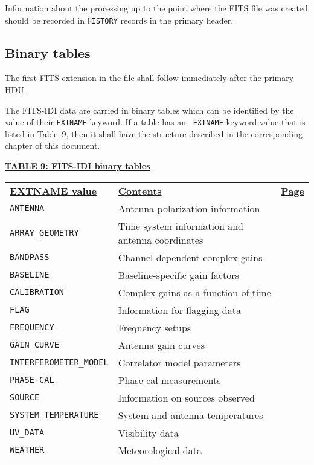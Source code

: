 \documentclass[twoside]{article}
\newcommand{\Hi}[1]{\textcolor{hicol}{#1}}
\begin{document}
Information about the processing up to the point where the FITS file
was created should be recorded in {\tt HISTORY} records in the primary
header.

\subsection{Binary tables}

The first FITS extension in the file shall follow immediately after
the primary \Hi{HDU\@.}

The FITS-IDI data are carried in binary tables which can be identified
by the value of their {\tt EXTNAME} keyword.  If a table has an {\tt
  EXTNAME} keyword \Hi{value} that is listed in Table~9, then it shall
have the structure described in the corresponding chapter of this
document.

\begin{center}
\underline{\bf{TABLE 9: FITS-IDI binary tables}}\\
\begin{tabular}{llr}
\noalign{\vspace{2pt}}
\underline{{\bf EXTNAME value\vphantom{y}}} &
   \underline{\bf{Contents\vphantom{y}}} & \underline{\Hi{\bf{Page}}} \\
\noalign{\vspace{2pt}}
{\tt ANTENNA}         & Antenna polarization information & \Hi{\pageref{s:AN}} \\
{\tt ARRAY\_GEOMETRY} & Time system information and antenna
                        coordinates & \Hi{\pageref{s:AG}} \\
\Hi{\tt BANDPASS}     & \Hi{Channel-dependent complex gains} & \Hi{\pageref{s:BP}} \\
\Hi{\tt BASELINE}     & \Hi{Baseline-specific gain factors} & \Hi{\pageref{s:BL}} \\
\Hi{\tt CALIBRATION}  & \Hi{Complex gains as a function of time} & \Hi{\pageref{s:CA}} \\
{\tt FLAG}            & \Hi{Information for flagging data} & \Hi{\pageref{s:FG}} \\
{\tt FREQUENCY}       & Frequency setups  & \Hi{\pageref{s:FQ}} \\
{\tt GAIN\_CURVE}     & Antenna gain curves  & \Hi{\pageref{s:GC}} \\
{\tt INTERFEROMETER\_MODEL} & Correlator model parameters & \Hi{\pageref{s:IM}} \\
{\tt PHASE-CAL}       & Phase cal measurements  & \Hi{\pageref{s:PC}} \\
{\tt SOURCE}          & Information on sources observed  & \Hi{\pageref{s:SO}} \\
{\tt SYSTEM\_TEMPERATURE} & System and antenna temperatures & \Hi{\pageref{s:TS}} \\
{\tt UV\_DATA}        & Visibility data  & \Hi{\pageref{s:UV}} \\
\Hi{\tt WEATHER}      & \Hi{Meteorological data} & \Hi{\pageref{s:WX}}
\end{tabular}
\end{center}
\end{document}
